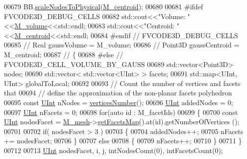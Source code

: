 \begin{DoxyCode}
00679         BB.\hyperlink{classFVCode3D_1_1BoundingBox_ae45df69b786a19e4413691e1c64059d0}{scaleNodesToPhysical}(\hyperlink{classFVCode3D_1_1Mesh3D_1_1Cell3D_a85077932a074f0903d085f9d33a13e09}{M\_centroid});
00680 
00681 \textcolor{preprocessor}{#ifdef FVCODE3D\_DEBUG\_CELLS}
00682         std::cout<<\textcolor{stringliteral}{"Volume: "}<<\hyperlink{classFVCode3D_1_1Mesh3D_1_1Cell3D_a7616a6d28fcd8013bc52f4d754569e60}{M\_volume}<<std::endl;
00683         std::cout<<\textcolor{stringliteral}{"Centroid: "}<<\hyperlink{classFVCode3D_1_1Mesh3D_1_1Cell3D_a85077932a074f0903d085f9d33a13e09}{M\_centroid}<<std::endl;
00684 \textcolor{preprocessor}{#endif // FVCODE3D\_DEBUG\_CELLS}
00685 \textcolor{comment}{//        Real gaussVolume = M\_volume;}
00686 \textcolor{comment}{//        Point3D gaussCentroid = M\_centroid;}
00687 \textcolor{comment}{//        \{}
00688 \textcolor{preprocessor}{#else // FVCODE3D\_CELL\_VOLUME\_BY\_GAUSS}
00689         std::vector<Point3D> nodes;
00690         std::vector< std::vector<UInt> > facets;
00691         std::map<UInt, UInt> globalToLocal;
00692 
00693         \textcolor{comment}{// Count the number of vertices and facets that}
00694         \textcolor{comment}{// define the approximation of the non-planar facets polyhedron}
00695         \textcolor{keyword}{const} \hyperlink{namespaceFVCode3D_a4bf7e328c75d0fd504050d040ebe9eda}{UInt} nNodes = \hyperlink{classFVCode3D_1_1Mesh3D_1_1Cell3D_a4877a883d7ae0abfe581809606ce260c}{verticesNumber}();
00696         \hyperlink{namespaceFVCode3D_a4bf7e328c75d0fd504050d040ebe9eda}{UInt} addedNodes = 0;
00697         \hyperlink{namespaceFVCode3D_a4bf7e328c75d0fd504050d040ebe9eda}{UInt} nFacets = 0;
00698         \textcolor{keywordflow}{for}(\textcolor{keyword}{auto} \textcolor{keywordtype}{id} : M\_facetIds)
00699         \{
00700             \textcolor{keyword}{const} \hyperlink{namespaceFVCode3D_a4bf7e328c75d0fd504050d040ebe9eda}{UInt} nodesFacet = \hyperlink{classFVCode3D_1_1Mesh3D_1_1Cell3D_a5f593479ad61eb1a043b7ec977db39bb}{M\_mesh}->\hyperlink{classFVCode3D_1_1Mesh3D_a76de387da2a552e3e1210d795bc7acf9}{getFacetsMap}().at(\textcolor{keywordtype}{id}).getNumberOfVertices
      ();
00701 
00702             \textcolor{keywordflow}{if}( nodesFacet > 3 )
00703             \{
00704                 addedNodes++;
00705                 nFacets += nodesFacet;
00706             \}
00707             \textcolor{keywordflow}{else}
00708             \{
00709                 nFacets++;
00710             \}
00711         \}
00712 
00713         \hyperlink{namespaceFVCode3D_a4bf7e328c75d0fd504050d040ebe9eda}{UInt} nodesFacet, i, j, intNodesCount(0), intFacetsCount(0);

\end{DoxyCode}

